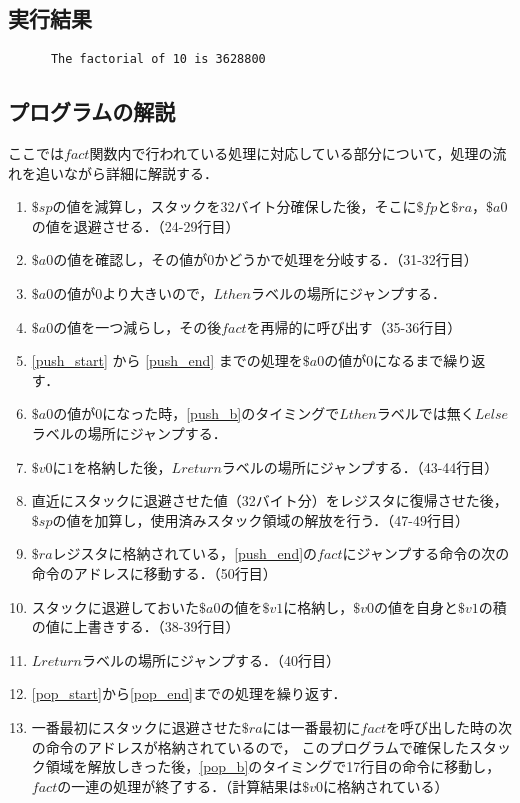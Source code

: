 \documentclass[a4j,11pt]{jarticle}
\begin{document}
\subsection{実行結果}

\begin{verbatim}
      The factorial of 10 is 3628800      
\end{verbatim}

\subsection{プログラムの解説}
ここでは$fact$関数内で行われている処理に対応している部分について，処理の流れを追いながら詳細に解説する．

\begin{enumerate}
      \item \label{push_start} $\$sp$の値を減算し，スタックを32バイト分確保した後，そこに$\$fp$と$\$ra$，$\$a0$の値を退避させる．（24-29行目）
      \item $\$a0$の値を確認し，その値が$0$かどうかで処理を分岐する．（31-32行目）
      \item \label{push_b}$\$a0$の値が$0$より大きいので，$Lthen$ラベルの場所にジャンプする．
      \item \label{push_end}$\$a0$の値を一つ減らし，その後$fact$を再帰的に呼び出す（35-36行目）
      \item \ref{push_start} から \ref{push_end} までの処理を$\$a0$の値が$0$になるまで繰り返す．
      \item $\$a0$の値が$0$になった時，\ref{push_b}のタイミングで$Lthen$ラベルでは無く$Lelse$ラベルの場所にジャンプする．
      \item $\$v0$に$1$を格納した後，$Lreturn$ラベルの場所にジャンプする．（43-44行目）
      \item \label{pop_start}直近にスタックに退避させた値（32バイト分）をレジスタに復帰させた後，$\$sp$の値を加算し，使用済みスタック領域の解放を行う．（47-49行目）
      \item \label{pop_b}$\$ra$レジスタに格納されている，\ref{push_end}の$fact$にジャンプする命令の次の命令のアドレスに移動する．（50行目）
      \item スタックに退避しておいた$\$a0$の値を$\$v1$に格納し，$\$v0$の値を自身と$\$v1$の積の値に上書きする．（38-39行目）
      \item \label{pop_end}$Lreturn$ラベルの場所にジャンプする．（40行目）
      \item \ref{pop_start}から\ref{pop_end}までの処理を繰り返す．
      \item 一番最初にスタックに退避させた$\$ra$には一番最初に$fact$を呼び出した時の次の命令のアドレスが格納されているので，
      このプログラムで確保したスタック領域を解放しきった後，\ref{pop_b}のタイミングで17行目の命令に移動し，$fact$の一連の処理が終了する．（計算結果は$\$v0$に格納されている）
\end{enumerate}
\end{document}
